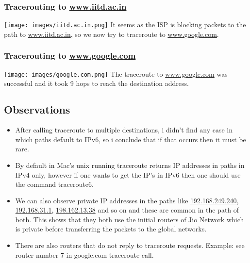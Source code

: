 \documentclass[11pt]{scrartcl}
\begin{document}
\subsubsection{Tracerouting to \underline{www.iitd.ac.in}}
\texttt{[image: images/iitd.ac.in.png]}
It seems as the ISP is blocking packets to the path to \underline{www.iitd.ac.in}, so we now try to traceroute to \underline{www.google.com}.
\subsubsection{Tracerouting to \underline{www.google.com}}
\texttt{[image: images/google.com.png]}
The traceroute to \underline{www.google.com} was successful and it took 9 hops to reach the destination address.
\subsection{Observations}
\begin{itemize}
    \item After calling traceroute to multiple destinations, i didn't find any case in which paths default to IPv6, so i conclude that if that occurs then it must be rare.
    \item By default in Mac's unix running traceroute returns IP addresses in paths in IPv4 only, however if one wants to get the IP's in IPv6 then one should use the command traceroute6.
    \item We can also observe private IP addresses in the paths like 
    \underline{192.168.249.240}, \underline{192.168.31.1}, \underline{198.162.13.38} and  so on and these are common in the path of both. This shows that they both use the initial routers of Jio Network which is private before transferring the packets to the global networks.
    \item There are also routers that do not reply to traceroute requests. Example: see router number 7 in google.com traceroute call.
\end{itemize}
\end{document}
